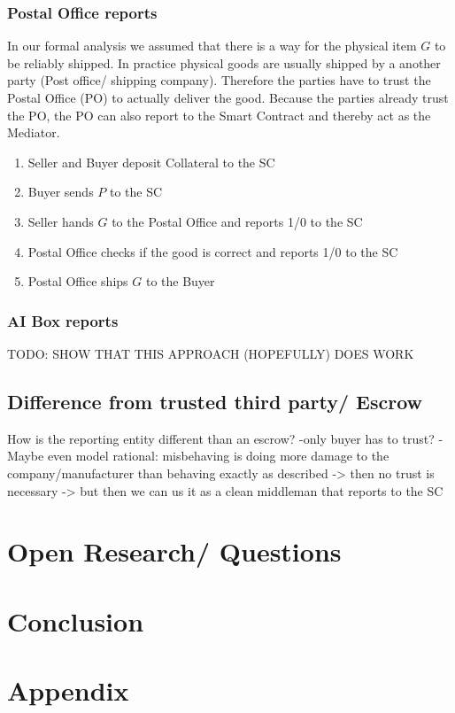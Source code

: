 \documentclass{cacthesis}
\begin{document}
\subsection{Postal Office reports}
In our formal analysis we assumed that there is a way for the physical item $G$ to be reliably shipped. In practice physical goods are usually shipped by a another party (Post office/ shipping company). \newline
Therefore the parties have to trust the Postal Office (PO) to actually deliver the good. Because the parties already trust the PO, the PO can also report to the Smart Contract and thereby act as the Mediator.
\begin{enumerate}
    \item Seller and Buyer deposit Collateral to the SC
    \item Buyer sends $P$ to the SC
    \item Seller hands $G$ to the Postal Office and reports 1/0 to the SC
    \item Postal Office checks if the good is correct and reports 1/0 to the SC
    \item Postal Office ships $G$ to the Buyer
\end{enumerate}
\subsection{AI Box reports}
TODO: SHOW THAT THIS APPROACH (HOPEFULLY) DOES WORK
\section{Difference from trusted third party/ Escrow}
How is the reporting entity different than an escrow?
-only buyer has to trust?
-Maybe even model rational: misbehaving is doing more damage to the company/manufacturer than behaving exactly as described -> then no trust is necessary -> but then we can us it as a clean middleman that reports to the SC
\chapter{Open Research/ Questions}

\chapter{Conclusion}

\chapter{Appendix}
\end{document}
